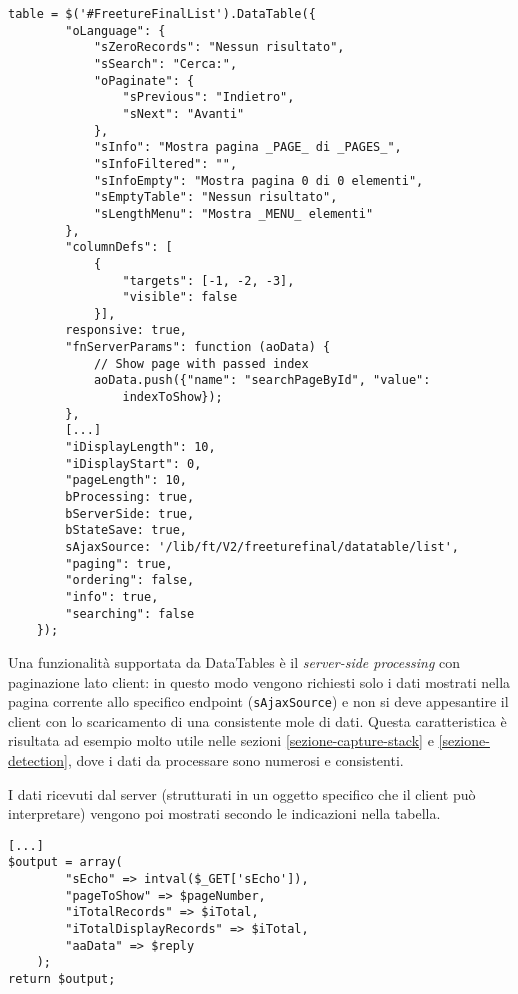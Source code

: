\begin{lstlisting}[style=JavaScript,caption={Parte dell'implementazione della DataTable della sezione \ref{ft-conf-automatica}},captionpos=b,label={lst:esempio-datatable}]
table = $('#FreetureFinalList').DataTable({
        "oLanguage": {
            "sZeroRecords": "Nessun risultato",
            "sSearch": "Cerca:",
            "oPaginate": {
                "sPrevious": "Indietro",
                "sNext": "Avanti"
            },
            "sInfo": "Mostra pagina _PAGE_ di _PAGES_",
            "sInfoFiltered": "",
            "sInfoEmpty": "Mostra pagina 0 di 0 elementi",
            "sEmptyTable": "Nessun risultato",
            "sLengthMenu": "Mostra _MENU_ elementi"
        },
        "columnDefs": [
            {
                "targets": [-1, -2, -3],
                "visible": false
            }],
        responsive: true,
        "fnServerParams": function (aoData) {
            // Show page with passed index
            aoData.push({"name": "searchPageById", "value": 
                indexToShow});
        },
        [...]
        "iDisplayLength": 10,
        "iDisplayStart": 0,
        "pageLength": 10,
        bProcessing: true,
        bServerSide: true,
        bStateSave: true,
        sAjaxSource: '/lib/ft/V2/freeturefinal/datatable/list',
        "paging": true,
        "ordering": false,
        "info": true,
        "searching": false
    });
\end{lstlisting}

Una funzionalità supportata da DataTables è il \emph{server-side processing} con paginazione lato client: in questo modo vengono richiesti solo i dati mostrati nella pagina corrente allo specifico endpoint (\texttt{sAjaxSource}) e non si deve appesantire il client con lo scaricamento di una consistente mole di dati. Questa caratteristica è risultata ad esempio molto utile nelle sezioni \ref{sezione-capture-stack} e \ref{sezione-detection}, dove i dati da processare sono numerosi e consistenti.

I dati ricevuti dal server (strutturati in un oggetto specifico che il client può interpretare) vengono poi mostrati secondo le indicazioni nella tabella.

\begin{lstlisting}[style=PHP,caption={Esempio di oggetto inviato al client per estrarre i dati da inserire nella DataTable. I dati veri e propri sono in \texttt{aaData}.},captionpos=b]
[...]
$output = array(
        "sEcho" => intval($_GET['sEcho']),
        "pageToShow" => $pageNumber,
        "iTotalRecords" => $iTotal,
        "iTotalDisplayRecords" => $iTotal,
        "aaData" => $reply
    );
return $output;
\end{lstlisting}

